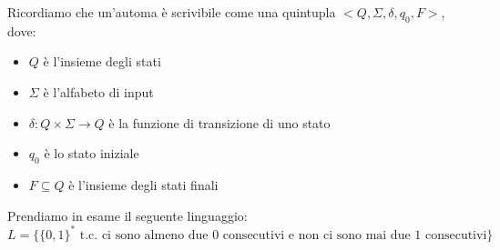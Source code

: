 \documentclass[a4paper,oneside]{scrbook}
\begin{document}
Ricordiamo che un'automa è scrivibile come una quintupla $<Q,\Sigma,\delta,q_0,F>$, dove:
\begin{itemize}
	\item $Q$ è l'insieme degli stati
	\item $\Sigma$ è l'alfabeto di input
	\item $\delta:Q\times\Sigma\rightarrow Q$ è la funzione di transizione di uno stato
	\item $q_0$ è lo stato iniziale
	\item $F\subseteq Q$ è l'insieme degli stati finali
\end{itemize}

Prendiamo in esame il seguente linguaggio:
$$ L=\{\{0,1\}^* \text{ t.c. ci sono almeno due 0 consecutivi e non ci sono mai due 1 consecutivi}\} $$
\end{document}
